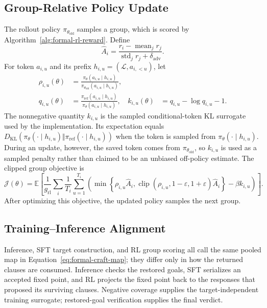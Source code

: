\subsection{Group-Relative Policy Update}
\label{app:grpo-details}

The rollout policy \(\pi_{\theta_{\mathrm{old}}}\) samples a group, which is
scored by Algorithm~\ref{alg:formal-rl-reward}.  Define
\begin{equation}
  \widehat A_i=
  \frac{r_i-\operatorname{mean}_{j}r_j}
       {\operatorname{std}_{j}r_j+\delta_{\mathrm{adv}}}.
  \label{eq:formal-advantage}
\end{equation}
For token \(a_{i,u}\) and its prefix
\(h_{i,u}=(\mathcal L,a_{i,<u})\), let
\begin{align}
  \rho_{i,u}(\theta)
  &=\frac{\pi_\theta(a_{i,u}\mid h_{i,u})}
          {\pi_{\theta_{\mathrm{old}}}(a_{i,u}\mid h_{i,u})},
  \label{eq:formal-token-ratio}\\
  q_{i,u}(\theta)
  &=\frac{\pi_{\mathrm{ref}}(a_{i,u}\mid h_{i,u})}
          {\pi_\theta(a_{i,u}\mid h_{i,u})},
  &k_{i,u}(\theta)&=q_{i,u}-\log q_{i,u}-1.
  \label{eq:formal-token-kl}
\end{align}
The nonnegative quantity \(k_{i,u}\) is the sampled conditional-token KL
surrogate used by the implementation.  Its expectation equals
\(D_{\mathrm{KL}}(\pi_\theta(\cdot\mid h_{i,u})\Vert
\pi_{\mathrm{ref}}(\cdot\mid h_{i,u}))\) when the token is sampled from
\(\pi_\theta(\cdot\mid h_{i,u})\).  During an update, however, the saved token
comes from \(\pi_{\theta_{\mathrm{old}}}\), so \(k_{i,u}\) is used as a
sampled penalty rather than claimed to be an unbiased off-policy estimate.
The clipped group objective is
\begin{equation}
  \mathcal J(\theta)=\mathbb E\!\left[
  \frac{1}{g_{\mathrm{rl}}}\sum_i\frac{1}{T_i}\sum_{u=1}^{T_i}
  \left(
  \min\!\left\{\rho_{i,u}\widehat A_i,
  \operatorname{clip}(\rho_{i,u},1-\varepsilon,1+\varepsilon)\widehat A_i
  \right\}-\beta k_{i,u}\right)\right].
  \label{eq:formal-grpo}
\end{equation}
After optimizing this objective, the updated policy samples the next group.

\subsection{Training--Inference Alignment}

Inference, SFT target construction, and RL group scoring all call the same
pooled map in Equation~\eqref{eq:formal-craft-map}; they differ only in how
the returned clauses are consumed.  Inference checks the restored goals, SFT
serializes an accepted fixed point, and RL projects the fixed point back to
the responses that proposed its surviving clauses.  Negative coverage supplies the target-independent
training surrogate; restored-goal verification supplies the final verdict.

